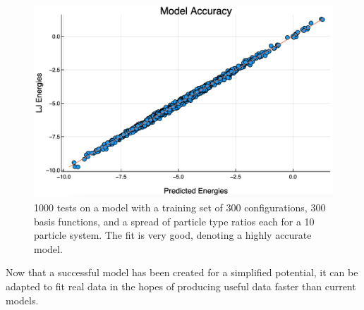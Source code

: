 \begin{figure}%
\centering
\includegraphics[scale = 0.45]{Figures/diatomicAccuracy}
\caption{1000 tests on a model with a training set of 300 configurations, 300 basis functions, and a spread of particle type ratios each for a 10 particle system. The fit is very good, denoting a highly accurate model.
\label{fig:diatomicAccuracy}}
\end{figure}

\par Now that a successful model has been created for a simplified potential, it can be adapted to fit real data in the hopes of producing useful data faster than current models.